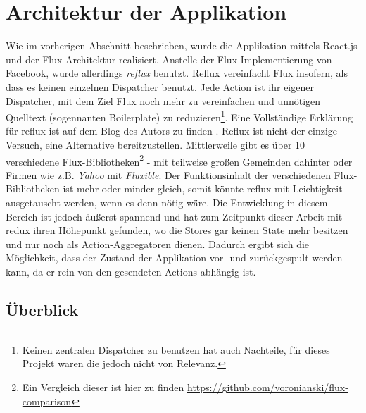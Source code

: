 \documentclass[12pt,twoside]{book}
\begin{document}
\section{Architektur der Applikation}

Wie im vorherigen Abschnitt beschrieben, wurde die Applikation mittels React.js und der Flux-Architektur realisiert. Anstelle der Flux-Implementierung von Facebook, wurde allerdings \textit{reflux} benutzt. Reflux vereinfacht Flux insofern, als dass es keinen einzelnen Dispatcher benutzt. Jede Action ist ihr eigener Dispatcher, mit dem Ziel Flux noch mehr zu vereinfachen und unnötigen Quelltext (sogennanten Boilerplate) zu reduzieren\footnote{Keinen zentralen Dispatcher zu benutzen hat auch Nachteile, für dieses Projekt waren die jedoch nicht von Relevanz.}. Eine Vollständige Erklärung für reflux ist auf dem Blog des Autors zu finden \cite{reflux}. Reflux ist nicht der einzige Versuch, eine Alternative bereitzustellen. Mittlerweile gibt es über 10 verschiedene Flux-Bibliotheken\footnote{Ein Vergleich dieser ist hier zu finden \url{https://github.com/voronianski/flux-comparison}} - mit teilweise großen Gemeinden dahinter oder Firmen wie z.B. \textit{Yahoo} mit \textit{Fluxible}. Der Funktionsinhalt der verschiedenen Flux-Bibliotheken ist mehr oder minder gleich, somit könnte reflux mit Leichtigkeit ausgetauscht werden, wenn es denn nötig wäre.
Die Entwicklung in diesem Bereich ist jedoch äußerst spannend und hat zum Zeitpunkt dieser Arbeit mit redux \cite{gitredux} ihren Höhepunkt gefunden, wo die Stores gar keinen State mehr besitzen und nur noch als Action-Aggregatoren dienen. Dadurch ergibt sich die Möglichkeit, dass der Zustand der Applikation vor- und zurückgespult werden kann, da er rein von den gesendeten Actions abhängig ist\citep{redux}.

\subsection{Überblick}
\end{document}
